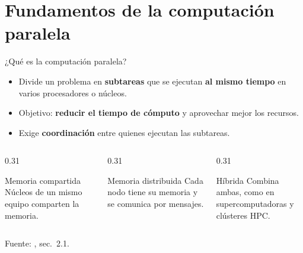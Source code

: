 \section{Fundamentos de la computación paralela}

\begin{frame}{¿Qué es la computación paralela?}
  \begin{itemize}
    \item Divide un problema en \textbf{subtareas} que se ejecutan
          \textbf{al mismo tiempo} en varios procesadores o núcleos.
    \item Objetivo: \textbf{reducir el tiempo de cómputo} y aprovechar mejor
          los recursos.
    \item Exige \textbf{coordinación} entre quienes ejecutan las subtareas.
  \end{itemize}

  \vspace{0.3cm}
  \begin{columns}[T]
    \begin{column}{0.31\textwidth}
      \begin{block}{Memoria compartida}
        \small Núcleos de un mismo equipo comparten la memoria.
      \end{block}
    \end{column}
    \begin{column}{0.31\textwidth}
      \begin{block}{Memoria distribuida}
        \small Cada nodo tiene su memoria y se comunica por mensajes.
      \end{block}
    \end{column}
    \begin{column}{0.31\textwidth}
      \begin{block}{Híbrida}
        \small Combina ambas, como en supercomputadoras y clústeres HPC.
      \end{block}
    \end{column}
  \end{columns}

  \vspace{0.2cm}
  {\tiny Fuente: \cite{dai2025parallel}, sec.~2.1.}
\end{frame}

